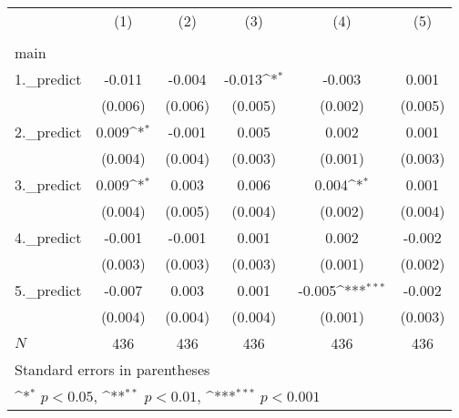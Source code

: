 {
\def\sym#1{\ifmmode^{#1}\else\(^{#1}\)\fi}
\begin{tabular}{l*{5}{c}}
\hline\hline
            &\multicolumn{1}{c}{(1)}&\multicolumn{1}{c}{(2)}&\multicolumn{1}{c}{(3)}&\multicolumn{1}{c}{(4)}&\multicolumn{1}{c}{(5)}\\
            &\multicolumn{1}{c}{} &\multicolumn{1}{c}{} &\multicolumn{1}{c}{} &\multicolumn{1}{c}{} &\multicolumn{1}{c}{} \\
\hline
main        &                     &                     &                     &                     &                     \\
1.\_predict  &      -0.011         &      -0.004         &      -0.013\sym{*}  &      -0.003         &       0.001         \\
            &     (0.006)         &     (0.006)         &     (0.005)         &     (0.002)         &     (0.005)         \\
[1em]
2.\_predict  &       0.009\sym{*}  &      -0.001         &       0.005         &       0.002         &       0.001         \\
            &     (0.004)         &     (0.004)         &     (0.003)         &     (0.001)         &     (0.003)         \\
[1em]
3.\_predict  &       0.009\sym{*}  &       0.003         &       0.006         &       0.004\sym{*}  &       0.001         \\
            &     (0.004)         &     (0.005)         &     (0.004)         &     (0.002)         &     (0.004)         \\
[1em]
4.\_predict  &      -0.001         &      -0.001         &       0.001         &       0.002         &      -0.002         \\
            &     (0.003)         &     (0.003)         &     (0.003)         &     (0.001)         &     (0.002)         \\
[1em]
5.\_predict  &      -0.007         &       0.003         &       0.001         &      -0.005\sym{***}&      -0.002         \\
            &     (0.004)         &     (0.004)         &     (0.004)         &     (0.001)         &     (0.003)         \\
\hline
\(N\)       &         436         &         436         &         436         &         436         &         436         \\
\hline\hline
\multicolumn{6}{l}{\footnotesize Standard errors in parentheses}\\
\multicolumn{6}{l}{\footnotesize \sym{*} \(p<0.05\), \sym{**} \(p<0.01\), \sym{***} \(p<0.001\)}\\
\end{tabular}
}
